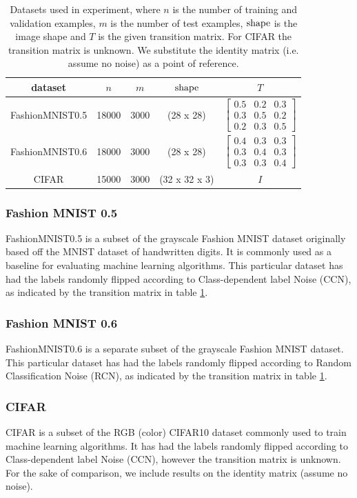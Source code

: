 \documentclass{article} %
\begin{document}
\begin{table}\begin{tabular}{ccccc} dataset & $n$ & $m$ & $\textup{shape}$ & $T$ \\\hline
FashionMNIST0.5 & 18000 & 3000 & (28 x 28) & $\begin{bmatrix}0.5 & 0.2 & 0.3\\0.3 & 0.5 & 0.2\\0.2 & 0.3 & 0.5\end{bmatrix}$\\
FashionMNIST0.6 & 18000 & 3000 & (28 x 28) & $\begin{bmatrix}0.4 & 0.3 & 0.3\\0.3 & 0.4 & 0.3\\0.3 & 0.3 & 0.4\end{bmatrix}$\\
CIFAR & 15000 & 3000 & (32 x 32 x 3) & $I$
\end{tabular}\caption{
  Datasets used in experiment, where $n$ is the number of training and validation examples, $m$ is the number of test examples, $\textup{shape}$ is the image shape and $T$ is the given transition matrix. For CIFAR the transition matrix is unknown. We substitute the identity matrix (i.e. assume no noise) as a point of reference.
  \label{tab:dataset}
}\end{table}

\subsubsection{Fashion MNIST 0.5}
FashionMNIST0.5 is a subset of the grayscale Fashion MNIST dataset originally based off the MNIST dataset of handwritten digits. It is commonly used as a baseline for evaluating machine learning algorithms. This particular dataset has had the labels randomly flipped according to Class-dependent label Noise (CCN), as indicated by the transition matrix in table \ref{tab:dataset}.

\subsubsection{Fashion MNIST 0.6}
FashionMNIST0.6 is a separate subset of the grayscale Fashion MNIST dataset. This particular dataset has had the labels randomly flipped according to Random Classification Noise (RCN), as indicated by the transition matrix in table \ref{tab:dataset}.

\subsubsection{CIFAR}
CIFAR is a subset of the RGB (color) CIFAR10 dataset commonly used to train machine learning algorithms. It has had the labels randomly flipped according to Class-dependent label Noise (CCN), however the transition matrix is unknown. For the sake of comparison, we include results on the identity matrix (assume no noise).
\end{document}
